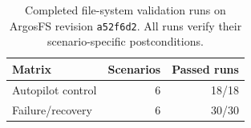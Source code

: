 \begin{table}[t]
  \centering
  \scriptsize
  \caption{Completed file-system validation runs on ArgosFS revision \texttt{a52f6d2}. All runs verify their scenario-specific postconditions.}
  \label{tab:validation-results}
  \begin{tabular}{@{}lrr@{}}
    \toprule
    Matrix & Scenarios & Passed runs \\
    \midrule
    Autopilot control & 6 & 18/18 \\
    Failure/recovery & 6 & 30/30 \\
    \bottomrule
  \end{tabular}
\end{table}
